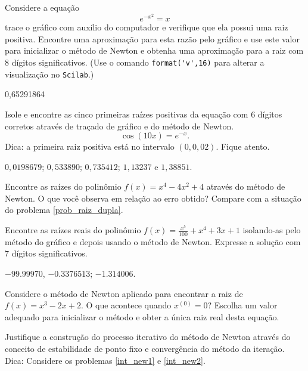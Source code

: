 \begin{exer}\label{new1} Considere a equação
  $$e^{-x^2}=x$$
trace o gráfico com auxílio do computador e verifique que ela possui uma raiz positiva. Encontre uma aproximação para esta razão pelo gráfico e use este valor para inicializar o método de Newton e obtenha uma aproximação para a raiz com 8 dígitos significativos. \ifisscilab (Use o comando \verb+format('v',16)+ para alterar a visualização no \verb+Scilab+.)\fi
\end{exer}
\begin{resp}
  0,65291864    
  \end{resp}

\begin{exer}\label{new2} Isole e encontre as cinco primeiras raízes positivas da equação com 6 dígitos corretos através de traçado de gráfico e do método de Newton.
$$\cos(10x)=e^{-x}.$$ Dica: a primeira raiz positiva está no intervalo $(0, 0,02)$. Fique atento.
\end{exer}
\begin{resp}
   $0,0198679$; $0,533890$; $0,735412$; $1,13237$ e $1,38851$.
  \end{resp}


\begin{exer}\label{new3} Encontre as raízes do polinômio $f(x)=x^4-4x^2+4$ através do método de Newton. O que você observa em relação ao erro obtido? Compare com a situação do problema \ref{prob_raiz_dupla}.
\end{exer}

\begin{exer}\label{new4} Encontre as raízes reais do polinômio $f(x)=\frac{x^5}{100}+x^4+3x+1$ isolando-as pelo método do gráfico e depois usando o método de Newton. Expresse a solução com 7 dígitos significativos.
\end{exer}
\begin{resp}
 $-99.99970$, $-0.3376513$; $-1.314006$.
 \end{resp}

\begin{exer}Considere o método de Newton aplicado para encontrar a raiz de $f(x)=x^3-2x+2$. O que acontece quando $x^{(0)}=0$? Escolha um valor adequado para inicializar o método e obter a única raiz real desta equação.
\end{exer}

\begin{exer} Justifique a construção do processo iterativo do método de Newton através do conceito de estabilidade de ponto fixo e convergência do método da iteração. Dica: Considere os problemas \ref{int_new1} e \ref{int_new2}.
\end{exer}

